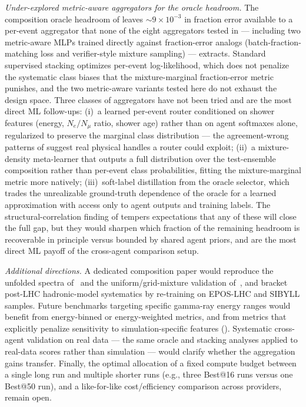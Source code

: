 \documentclass[universe,article,submit,pdftex,oneauthor]{Definitions/mdpi}
\begin{document}
\textit{Under-explored metric-aware aggregators for the oracle headroom.} The composition oracle headroom of  leaves ${\sim}9 \times 10^{-3}$ in fraction error available to a per-event aggregator that none of the eight aggregators tested in  --- including two metric-aware MLPs trained directly against fraction-error analogs (batch-fraction-matching loss and verifier-style mixture sampling) --- extracts. Standard supervised stacking optimizes per-event log-likelihood, which does not penalize the systematic class biases that the mixture-marginal fraction-error metric punishes, and the two metric-aware variants tested here do not exhaust the design space. Three classes of aggregators have not been tried and are the most direct ML follow-ups: (i)~a learned per-event router conditioned on shower features (energy, $N_e/N_\mu$ ratio, shower age) rather than on agent softmaxes alone, regularized to preserve the marginal class distribution --- the agreement-wrong patterns of  suggest real physical handles a router could exploit; (ii)~a mixture-density meta-learner that outputs a full distribution over the test-ensemble composition rather than per-event class probabilities, fitting the mixture-marginal metric more natively; (iii)~soft-label distillation from the oracle selector, which trades the unrealizable ground-truth dependence of the oracle for a learned approximation with access only to agent outputs and training labels. The structural-correlation finding of  tempers expectations that any of these will close the full gap, but they would sharpen which fraction of the remaining headroom is recoverable in principle versus bounded by shared agent priors, and are the most direct ML payoff of the cross-agent comparison setup.

\textit{Additional directions.} A dedicated composition paper would reproduce the unfolded spectra of~\cite[Figs.~2--3]{kascade_jcap} and the uniform/grid-mixture validation of~\cite[Fig.~7]{kascade_jinst}, and bracket post-LHC hadronic-model systematics by re-training on EPOS-LHC and SIBYLL samples. Future benchmarks targeting specific gamma-ray energy ranges would benefit from energy-binned or energy-weighted metrics, and from metrics that explicitly penalize sensitivity to simulation-specific features (). Systematic cross-agent validation on real data --- the same oracle and stacking analyses applied to real-data scores rather than simulation --- would clarify whether the aggregation gains transfer. Finally, the optimal allocation of a fixed compute budget between a single long run and multiple shorter runs (e.g., three Best@16 runs versus one Best@50 run), and a like-for-like cost/efficiency comparison across providers, remain open.
\end{document}
